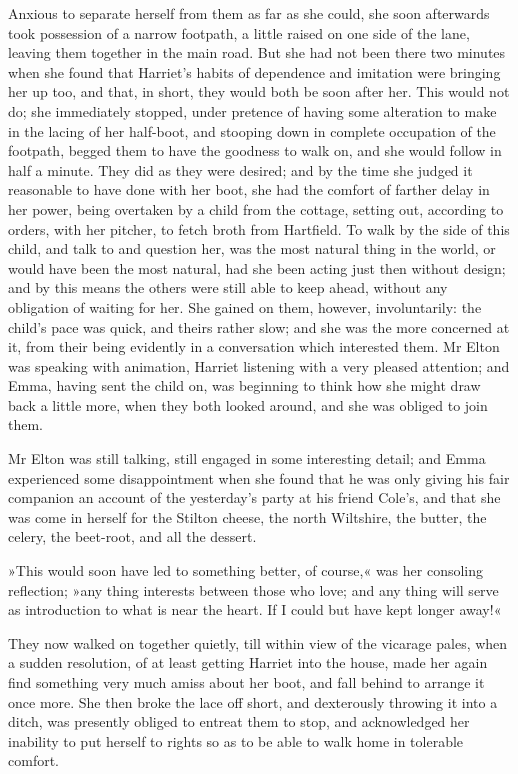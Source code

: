 Anxious to separate herself from them as far as she could, she soon afterwards took possession of a narrow footpath, a little raised on one side of the lane, leaving them together in the main road. But she had not been there two minutes when she found that Harriet's habits of dependence and imitation were bringing her up too, and that, in short, they would both be soon after her. This would not do; she immediately stopped, under pretence of having some alteration to make in the lacing of her half-boot, and stooping down in complete occupation of the footpath, begged them to have the goodness to walk on, and she would follow in half a minute. They did as they were desired; and by the time she judged it reasonable to have done with her boot, she had the comfort of farther delay in her power, being overtaken by a child from the cottage, setting out, according to orders, with her pitcher, to fetch broth from Hartfield. To walk by the side of this child, and talk to and question her, was the most natural thing in the world, or would have been the most natural, had she been acting just then without design; and by this means the others were still able to keep ahead, without any obligation of waiting for her. She gained on them, however, involuntarily: the child's pace was quick, and theirs rather slow; and she was the more concerned at it, from their being evidently in a conversation which interested them. Mr Elton was speaking with animation, Harriet listening with a very pleased attention; and Emma, having sent the child on, was beginning to think how she might draw back a little more, when they both looked around, and she was obliged to join them.

Mr Elton was still talking, still engaged in some interesting detail; and Emma experienced some disappointment when she found that he was only giving his fair companion an account of the yesterday's party at his friend Cole's, and that she was come in herself for the Stilton cheese, the north Wiltshire, the butter, the celery, the beet-root, and all the dessert.

»This would soon have led to something better, of course,« was her consoling reflection; »any thing interests between those who love; and any thing will serve as introduction to what is near the heart. If I could but have kept longer away!«

They now walked on together quietly, till within view of the vicarage pales, when a sudden resolution, of at least getting Harriet into the house, made her again find something very much amiss about her boot, and fall behind to arrange it once more. She then broke the lace off short, and dexterously throwing it into a ditch, was presently obliged to entreat them to stop, and acknowledged her inability to put herself to rights so as to be able to walk home in tolerable comfort.

